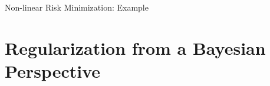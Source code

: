 \begin{frame}{Non-linear Risk Minimization: Example}


\end{frame}



\section{Regularization from a Bayesian Perspective}

